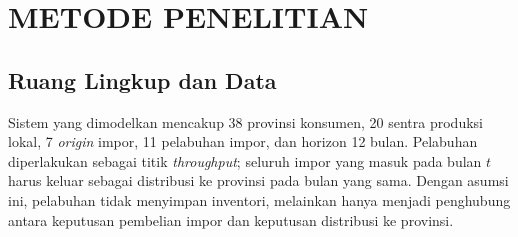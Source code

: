\documentclass[journal]{IEEEtran}
\theoremstyle{definition}
\theoremstyle{definition}
\theoremstyle{plain}
\begin{document}
    \section{METODE PENELITIAN}
    \subsection{Ruang Lingkup dan Data}
    Sistem yang dimodelkan mencakup 38 provinsi konsumen, 20 sentra produksi lokal, 7 \textit{origin} impor, 11 pelabuhan impor, dan horizon 12 bulan. Pelabuhan diperlakukan sebagai titik \textit{throughput}; seluruh impor yang masuk pada bulan $t$ harus keluar sebagai distribusi ke provinsi pada bulan yang sama. Dengan asumsi ini, pelabuhan tidak menyimpan inventori, melainkan hanya menjadi penghubung antara keputusan pembelian impor dan keputusan distribusi ke provinsi.
\end{document}
